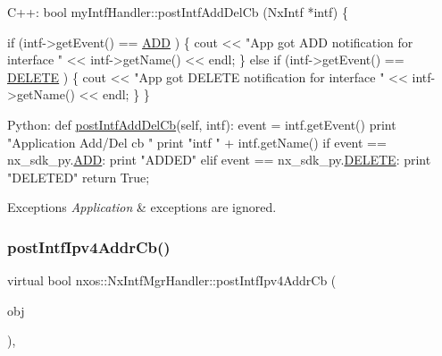 \begin{DoxyCode}
C++:
   \textcolor{keywordtype}{bool}
   myIntfHandler::postIntfAddDelCb (NxIntf *intf)
   \{
    
   \textcolor{keywordflow}{if} (intf->getEvent() == \mbox{\hyperlink{nx__common_8h_af9a9040b7681199d386e94eb888018cba93d8c810253e44a0fd5f3d8d26032ad5}{ADD}} ) \{
      cout << \textcolor{stringliteral}{"App got ADD notification for interface  "} << 
      intf->getName() << endl;
   \} \textcolor{keywordflow}{else} \textcolor{keywordflow}{if} (intf->getEvent() == \mbox{\hyperlink{nx__common_8h_af9a9040b7681199d386e94eb888018cba7ec7c9f77651a43ea2562bb5bcb6a3a9}{DELETE}} ) \{
      cout << \textcolor{stringliteral}{"App got DELETE notification for interface "} << 
      intf->getName() << endl;
   \}
   \}  

Python:
   def \mbox{\hyperlink{classnxos_1_1_nx_intf_mgr_handler_afe79bff5ee5b314111e2ce7c7226e73f}{postIntfAddDelCb}}(\textcolor{keyword}{self}, intf):
      event = intf.getEvent()
      print \textcolor{stringliteral}{"Application Add/Del cb "}
      print \textcolor{stringliteral}{"intf "} + intf.getName()
      if event == nx\_sdk\_py.\mbox{\hyperlink{nx__common_8h_af9a9040b7681199d386e94eb888018cba93d8c810253e44a0fd5f3d8d26032ad5}{ADD}}:
         print \textcolor{stringliteral}{"ADDED"}
      elif event == nx\_sdk\_py.\mbox{\hyperlink{nx__common_8h_af9a9040b7681199d386e94eb888018cba7ec7c9f77651a43ea2562bb5bcb6a3a9}{DELETE}}:
         print \textcolor{stringliteral}{"DELETED"}
      return True;   
\end{DoxyCode}



\begin{DoxyExceptions}{Exceptions}
{\em Application} & exceptions are ignored. \\
\hline
\end{DoxyExceptions}
\mbox{\label{classnxos_1_1_nx_intf_mgr_handler_a8f96e0a3a70f5f566b8f0f5928bf5e64}} 
\subsubsection{\texorpdfstring{post\+Intf\+Ipv4\+Addr\+Cb()}{postIntfIpv4AddrCb()}}
{\footnotesize\ttfamily virtual bool nxos\+::\+Nx\+Intf\+Mgr\+Handler\+::post\+Intf\+Ipv4\+Addr\+Cb (\begin{DoxyParamCaption}\item[{\mbox{\hyperlink{classnxos_1_1_nx_intf}{Nx\+Intf}} $\ast$}]{obj }\end{DoxyParamCaption})\hspace{0.3cm}{\ttfamily [inline]}, {\ttfamily [virtual]}}

